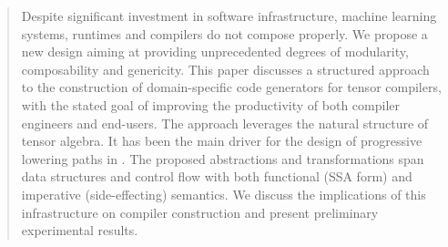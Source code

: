 \begin{abstract}
Despite significant investment in software infrastructure, machine learning systems, runtimes and compilers do not compose properly.
We propose a new design aiming at providing unprecedented degrees of modularity, composability and genericity.
This paper discusses a structured approach to the construction of domain-specific code generators for tensor compilers, with the stated goal of improving the productivity of both compiler engineers and end-users.
The approach leverages the natural structure of tensor algebra.
It has been the main driver for the design of progressive lowering paths in \MLIR.
The proposed abstractions and transformations span data structures and control flow with both functional (SSA form) and imperative (side-effecting) semantics.
We discuss the implications of this infrastructure on compiler construction and present preliminary experimental results.
\end{abstract}
